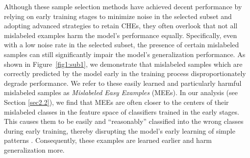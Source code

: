 
Although these sample selection methods have achieved decent performance by relying on early training stages to minimize noise in the selected subset and adopting advanced strategies to retain CHEs, they often overlook that not all mislabeled examples harm the model's performance equally. Specifically, even with a low noise rate in the selected subset, the presence of certain mislabeled samples can still significantly impair the model's generalization performance. As shown in Figure~\ref{fig1:sub1}, we demonstrate that mislabeled samples which are correctly predicted by the model early in the training process disproportionately degrade performance. We refer to these easily learned and particularly harmful mislabeled samples as \emph{Mislabeled Easy Examples} (MEEs). In our analysis (see Section \ref{sec2.2}), we find that MEEs are often closer to the centers of their mislabeled classes in the feature space of classifiers trained in the early stages. This causes them to be easily and ``reasonably'' classified into the wrong classes during early training, thereby disrupting the model's early learning of simple patterns \cite{arpit2017closer}. Consequently, these examples are learned earlier and harm generalization more.


